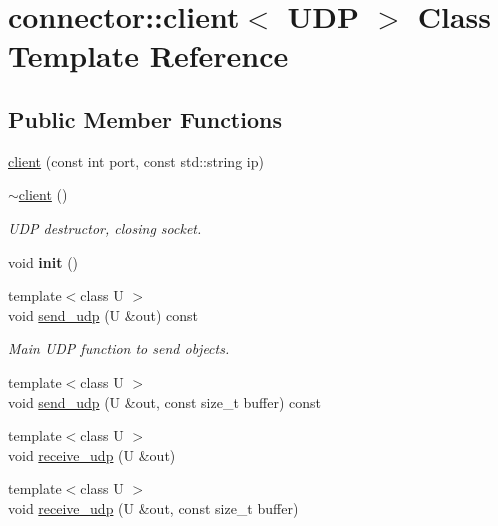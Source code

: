 \hypertarget{classconnector_1_1client_3_01UDP_01_4}{}\section{connector\+:\+:client$<$ U\+DP $>$ Class Template Reference}
\label{classconnector_1_1client_3_01UDP_01_4}
\subsection*{Public Member Functions}
\begin{DoxyCompactItemize}
\item 
\hyperlink{classconnector_1_1client_3_01UDP_01_4_ac0fe47fc2a027af240d0d812c0bfc386}{client} (const int port, const std\+::string ip)
\item 
\mbox{\label{classconnector_1_1client_3_01UDP_01_4_a1f974f60f36277f83ee8afb7a0ed5886}} 
\hyperlink{classconnector_1_1client_3_01UDP_01_4_a1f974f60f36277f83ee8afb7a0ed5886}{$\sim$client} ()
\begin{DoxyCompactList}\small\item\em U\+DP destructor, closing socket. \end{DoxyCompactList}\item 
\mbox{\label{classconnector_1_1client_3_01UDP_01_4_ae6b9cac480e39fe7b9f4350f98e4d043}} 
void {\bfseries init} ()
\item 
{\footnotesize template$<$class U $>$ }\\void \hyperlink{classconnector_1_1client_3_01UDP_01_4_abc0b3c6c80093a92137fbd27a604d658}{send\+\_\+udp} (U \&out) const
\begin{DoxyCompactList}\small\item\em Main U\+DP function to send objects. \end{DoxyCompactList}\item 
{\footnotesize template$<$class U $>$ }\\void \hyperlink{classconnector_1_1client_3_01UDP_01_4_adab4762b60763433e487ffe8296e3280}{send\+\_\+udp} (U \&out, const size\+\_\+t buffer) const
\item 
{\footnotesize template$<$class U $>$ }\\void \hyperlink{classconnector_1_1client_3_01UDP_01_4_ae6904da6d74dd64ba63fd0a14445bd01}{receive\+\_\+udp} (U \&out)
\item 
{\footnotesize template$<$class U $>$ }\\void \hyperlink{classconnector_1_1client_3_01UDP_01_4_a4e9796bdc80d16af8b52aa2e7ab991d3}{receive\+\_\+udp} (U \&out, const size\+\_\+t buffer)
\end{DoxyCompactItemize}
